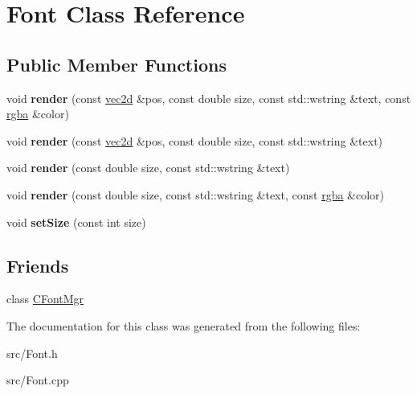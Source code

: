 \hypertarget{class_font}{
\section{Font Class Reference}
\label{class_font}
}
\subsection*{Public Member Functions}
\begin{DoxyCompactItemize}
\item 
\hypertarget{class_font_a655b8b32288541d5f6e988f35f3cc842}{
void {\bfseries render} (const \hyperlink{classvec2d}{vec2d} \&pos, const double size, const std::wstring \&text, const \hyperlink{classrgba}{rgba} \&color)}
\label{class_font_a655b8b32288541d5f6e988f35f3cc842}

\item 
\hypertarget{class_font_ae8143429d803e39132940a490c1621c7}{
void {\bfseries render} (const \hyperlink{classvec2d}{vec2d} \&pos, const double size, const std::wstring \&text)}
\label{class_font_ae8143429d803e39132940a490c1621c7}

\item 
\hypertarget{class_font_af1d03f62c12e4bf1982739ea7816dfa6}{
void {\bfseries render} (const double size, const std::wstring \&text)}
\label{class_font_af1d03f62c12e4bf1982739ea7816dfa6}

\item 
\hypertarget{class_font_ac4b7f5628cf8f33d03fc3183e0c69e64}{
void {\bfseries render} (const double size, const std::wstring \&text, const \hyperlink{classrgba}{rgba} \&color)}
\label{class_font_ac4b7f5628cf8f33d03fc3183e0c69e64}

\item 
\hypertarget{class_font_acc434587d0bc0a17bf04a65ad1214a9c}{
void {\bfseries setSize} (const int size)}
\label{class_font_acc434587d0bc0a17bf04a65ad1214a9c}

\end{DoxyCompactItemize}
\subsection*{Friends}
\begin{DoxyCompactItemize}
\item 
\hypertarget{class_font_a6ad503389779bbc2d3efa7456d87ed3c}{
class \hyperlink{class_font_a6ad503389779bbc2d3efa7456d87ed3c}{CFontMgr}}
\label{class_font_a6ad503389779bbc2d3efa7456d87ed3c}

\end{DoxyCompactItemize}


The documentation for this class was generated from the following files:\begin{DoxyCompactItemize}
\item 
src/Font.h\item 
src/Font.cpp\end{DoxyCompactItemize}
